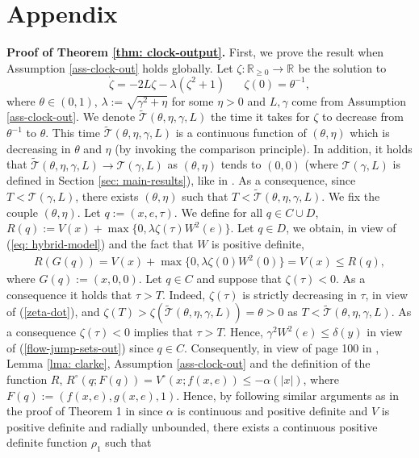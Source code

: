 \documentclass[a4paper, 9pt, twocolumn]{IEEEtran}
\theoremstyle{plain}
\theoremstyle{definition}
\newcommand{\R}[2]{\ensuremath{\mathbb{R}^{#1}_{#2}}}
\begin{document}
\section*{Appendix}
\noindent\textbf{Proof of Theorem \ref{thm: clock-output}.}
First, we prove the result when Assumption \ref{ass-clock-out} holds globally. Let $\zeta: \R{}{\geq 0} \rightarrow \R{}{}$ be the solution to
\begin{equation} \label{zeta-dot}
  \dot{\zeta} = -2L\zeta - \lambda(\zeta^{2} + 1) \hspace{20pt} \zeta(0) = \theta^{-1},
\end{equation}
where $\theta \in (0,1)$, $\lambda := \sqrt{\gamma^{2} + \eta}$ for some $\eta > 0$ and $L, \gamma$ come from Assumption \ref{ass-clock-out}. We denote $\widetilde{\mathcal{T}}(\theta, \eta, \gamma, L)$ the time it takes for $\zeta$ to decrease from $\theta^{-1}$ to $\theta$. This time $\widetilde{\mathcal{T}}(\theta, \eta, \gamma, L)$ is a continuous function of $(\theta, \eta)$ which is decreasing in $\theta$ and $\eta$ (by invoking the comparison principle). In addition, it holds that $\widetilde{\mathcal{T}}(\theta, \eta, \gamma, L) \rightarrow \mathcal{T}(\gamma, L)$ as $(\theta, \eta)$ tends to $(0, 0)$ (where $\mathcal{T}(\gamma, L)$ is defined in Section \ref{sec: main-results}), like in \cite{Nesic2009explicit}. As a consequence, since $T< \mathcal{T}(\gamma, L)$, there exists $(\theta, \eta)$ such that $T<\widetilde{\mathcal{T}}(\theta, \eta, \gamma, L)$. We fix the couple $(\theta, \eta)$. Let $q := (x,e,\tau)$. We define for all $q \in C\cup D$, $R(q) := V(x) + \max\{0, \lambda\zeta(\tau)W^{2}(e)\}$. Let $q\in D$, we obtain, in view of (\ref{eq: hybrid-model}) and the fact that $W$ is positive definite,
\begin{align}
  R(G(q)) = V(x) + \max\{0, \lambda\zeta(0)W^{2}(0)\} = V(x) \leq R(q), \label{R-all-D}
\end{align}
where $G(q) := (x,0,0)$. Let $q\in C$ and suppose that $\zeta(\tau) < 0$. As a consequence it holds that $\tau > T$. Indeed, $\zeta(\tau)$ is strictly decreasing in $\tau$, in view of (\ref{zeta-dot}), and $\zeta(T)>\zeta(\widetilde{\mathcal{T}}(\theta, \eta, \gamma, L)) = \theta > 0$ as $T<\widetilde{\mathcal{T}}(\theta, \eta, \gamma, L)$. As a consequence $\zeta(\tau) < 0$ implies that $\tau>T$. Hence, $\gamma^{2} W^{2}(e) \leq  \delta(y)$ in view of (\ref{flow-jump-sets-out}) since $q \in C$. Consequently, in view of page 100 in \cite{Teel-Praly-mcss-00}, Lemma \ref{lma: clarke}, Assumption \ref{ass-clock-out} and the definition of the function $R$, $ R^{\circ}(q; F(q)) = V^{\circ}(x; f(x,e)) \leq -\alpha(|x|)$, where $F(q) := (f(x,e), g(x,e), 1)$. Hence, by following similar arguments as in the proof of Theorem 1 in \cite{Nesic2009explicit} since $\alpha$ is continuous and positive definite and $V$ is positive definite and radially unbounded, there exists a continuous positive definite function $\rho_{1}$ such that
\end{document}
